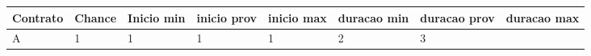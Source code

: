 \documentclass[11pt]{article}
\begin{document}
    \begin{longtable}[]{@{}llllllll@{}}
\toprule
\begin{minipage}[b]{0.04\columnwidth}\raggedright\strut
Contrato\strut
\end{minipage} & \begin{minipage}[b]{0.04\columnwidth}\raggedright\strut
Chance\strut
\end{minipage} & \begin{minipage}[b]{0.04\columnwidth}\raggedright\strut
Inicio min\strut
\end{minipage} & \begin{minipage}[b]{0.04\columnwidth}\raggedright\strut
inicio prov\strut
\end{minipage} & \begin{minipage}[b]{0.04\columnwidth}\raggedright\strut
inicio max\strut
\end{minipage} & \begin{minipage}[b]{0.04\columnwidth}\raggedright\strut
duracao min\strut
\end{minipage} & \begin{minipage}[b]{0.04\columnwidth}\raggedright\strut
duracao prov\strut
\end{minipage} & \begin{minipage}[b]{0.04\columnwidth}\raggedright\strut
duracao max\strut
\end{minipage}\tabularnewline
\midrule
\endhead
\begin{minipage}[t]{0.04\columnwidth}\raggedright\strut
A\strut
\end{minipage} & \begin{minipage}[t]{0.04\columnwidth}\raggedright\strut
1\strut
\end{minipage} & \begin{minipage}[t]{0.04\columnwidth}\raggedright\strut
1\strut
\end{minipage} & \begin{minipage}[t]{0.04\columnwidth}\raggedright\strut
1\strut
\end{minipage} & \begin{minipage}[t]{0.04\columnwidth}\raggedright\strut
1\strut
\end{minipage} & \begin{minipage}[t]{0.04\columnwidth}\raggedright\strut
2\strut
\end{minipage} & \begin{minipage}[t]{0.04\columnwidth}\raggedright\strut
3\strut
\end{minipage} & \begin{minipage}[t]{0.04\columnwidth}\raggedright\strut

\end{minipage}
\end{longtable}
\end{document}
